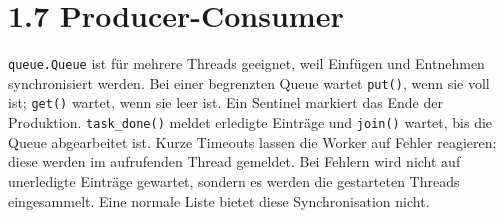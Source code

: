 \documentclass[10pt,a4paper]{article}
\begin{document}
\section*{1.7 Producer-Consumer}

\texttt{queue.Queue} ist für mehrere Threads geeignet, weil Einfügen und Entnehmen synchronisiert werden. Bei einer begrenzten Queue wartet \texttt{put()}, wenn sie voll ist; \texttt{get()} wartet, wenn sie leer ist. Ein Sentinel markiert das Ende der Produktion. \texttt{task\_done()} meldet erledigte Einträge und \texttt{join()} wartet, bis die Queue abgearbeitet ist. Kurze Timeouts lassen die Worker auf Fehler reagieren; diese werden im aufrufenden Thread gemeldet. Bei Fehlern wird nicht auf unerledigte Einträge gewartet, sondern es werden die gestarteten Threads eingesammelt. Eine normale Liste bietet diese Synchronisation nicht.
\end{document}
